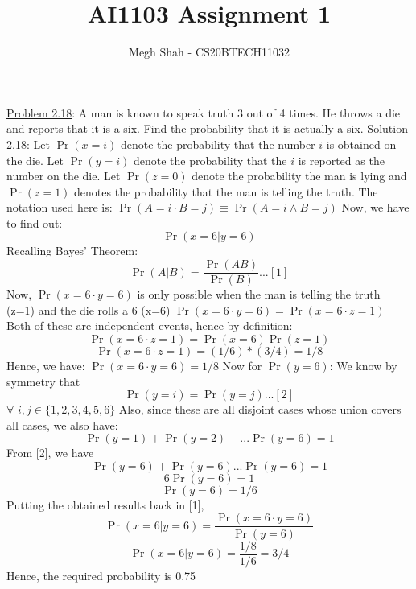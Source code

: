 \documentclass{article}
\title{AI1103 Assignment 1}
\author{Megh Shah - CS20BTECH11032}
\date{}
\begin{document}
\maketitle
\begin{multicols*}{2}
\section*{}

\underline {Problem 2.18}: \newline \newline A man is known to speak truth 3 out of 4 times. He throws a die and reports that it is a six. Find the probability that it is actually a six.
\newline \newline \underline {Solution 2.18}: \newline \newline Let $\Pr(x=i)$ denote the probability that the number $i$ is obtained on the die.
\newline Let $\Pr(y=i)$ denote the probability that the $i$ is reported as the number on the die.
\newline Let $\Pr(z=0)$ denote the probability the man is lying and $\Pr(z=1)$ denotes the probability that the man is telling the truth.
\newline \newline The notation used here is:
\newline $\Pr(A=i\cdot B=j)\equiv \Pr(A=i \land B=j)$
\newline \newline Now, we have to find out: $$\Pr(x=6|y=6)$$
Recalling Bayes' Theorem: 
$$ \Pr(A|B)=\frac{\Pr(AB)}{\Pr(B)} ... [1] $$
Now, $\Pr(x=6 \cdot y=6)$ is only possible when the man is telling the truth (z=1) and the die rolls a 6 (x=6)
\newline $\Pr(x=6 \cdot y=6)=\Pr(x=6 \cdot z=1)$
\newline Both of these are independent events, hence by definition:
$$\Pr(x=6 \cdot z=1)=\Pr(x=6)\Pr(z=1) $$
$$\Pr(x=6 \cdot z=1)=(1/6)*(3/4)=1/8 $$
Hence, we have: 
\newline $\Pr(x=6 \cdot y=6)=1/8 $
\newline \newline Now for $\Pr(y=6)$:
\newline We know by symmetry that $$\Pr(y=i) = \Pr(y=j) ... [2]$$ $\forall$ $i,j \in \{ 1,2,3,4,5,6 \}$ 
\newline \newline Also, since these are all disjoint cases whose union covers all cases, we also have:
\newline $$ \Pr(y=1)+\Pr(y=2)+...\Pr(y=6) = 1 $$
\newline From [2], we have 
$$ \Pr(y=6)+\Pr(y=6)...\Pr(y=6) = 1 $$
$$ 6\Pr(y=6) = 1 $$
$$ \Pr(y=6) = 1/6 $$
Putting the obtained results back in [1],
$$\Pr(x=6|y=6) = \frac{\Pr(x=6 \cdot y=6)}{\Pr(y=6)} $$
$$\Pr(x=6|y=6) = \frac{1/8}{1/6} = 3/4$$
Hence, the required probability is 0.75
\end{multicols*}
\end{document}
